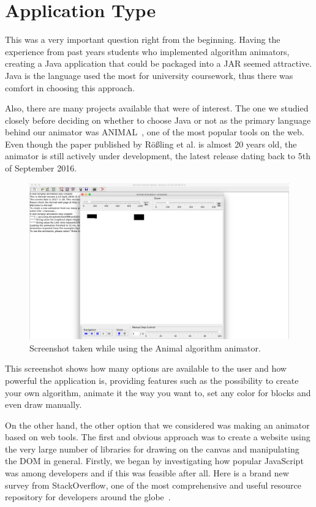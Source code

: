 \documentclass{l4proj}
\begin{document}
\section{Application Type}

This was a very important question right from the beginning. Having the experience from past years students who
implemented algorithm animators, creating a Java application that could be packaged into a JAR seemed attractive. Java is the
language used the most for university coursework, thus there was comfort in choosing this approach.

Also, there are many projects available that were of interest. The one we studied closely before deciding on whether to
choose Java or not as the primary language behind our animator was ANIMAL~\cite{animal-algo-animation}, one of the most popular tools on the
web. Even though the paper published by Rößling et al. is almost 20 years old, the animator is still actively under
development, the latest release dating back to 5th of September 2016.

\begin{figure}[!ht]
    \centering
    \includegraphics[scale=0.25]{animal-algo-animator}
    \caption{Screenshot taken while using the Animal algorithm animator.}
    \label{fig:animal-algo-animator}
\end{figure}

This screenshot shows how many options are available to the user and how powerful the application is, providing
features such as the possibility to create
your own algorithm, animate it the way you want to, set any color for blocks and even draw manually.

On the other hand, the other option that we considered was making an animator based on web tools. The first and obvious
approach was to create a website using the very large number of libraries for drawing on the canvas and manipulating
the DOM in general. Firstly, we began by investigating how popular JavaScript was among developers and if this was
feasible after all. Here is a brand new survey from StackOverflow, one of the most comprehensive and useful resource repository for developers around
the globe~\cite{stackoverflow-survey}.
\end{document}
